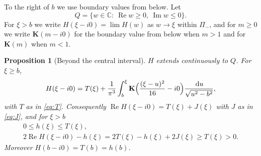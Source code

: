 \documentclass[11pt]{amsart}
\numberwithin{equation}{section}
\newtheorem{proposition}[theorem]{Proposition}
\theoremstyle{definition}
\theoremstyle{remark}
\newcommand{\C}{\mathbb{C}}
\newcommand{\Pim}{\Pi_{-}}
\newcommand{\dd}{\,\mathrm{d}}
\DeclareMathOperator{\re}{Re}
\DeclareMathOperator{\im}{Im}
\newcommand{\Kc}{\mathbf{K}}
\begin{document}
To the right of $b$ we use boundary values from below. Let
\[
Q=\{w\in\C:\ \re w\ge0,\ \im w\le0\}.
\]
For $\xi>b$ we write $H(\xi-i0)=\lim H(w)$ as $w\to \xi$ within $\Pim$, and for
$m\ge0$ we write $\Kc(m-i0)$ for the boundary value from below when $m>1$ and
for $\Kc(m)$ when $m<1$.

\begin{proposition}[Beyond the central interval]\label{prop:beyond}
$H$ extends continuously to $Q$. For $\xi\ge b$,
\begin{equation}\label{eq:Hbeyond}
H(\xi-i0)=T(\xi)+\frac1{\pi^3}\int_b^\xi\Kc\Bigl(\frac{(\xi-u)^2}{16}-i0\Bigr)\frac{\dd u}{\sqrt{u^2-b^2}},
\end{equation}
with $T$ as in \eqref{eq:T}. Consequently $\re H(\xi-i0)=T(\xi)+J(\xi)$ with $J$ as
in \eqref{eq:J}, and for $\xi>b$
\begin{equation}\label{eq:positive}
\begin{gathered}
0\le h(\xi)\le T(\xi),\\
2\re H(\xi-i0)-h(\xi)=2T(\xi)-h(\xi)+2J(\xi)\ge T(\xi)>0 .
\end{gathered}
\end{equation}
Moreover $H(b-i0)=T(b)=h(b)$.
\end{proposition}
\end{document}
